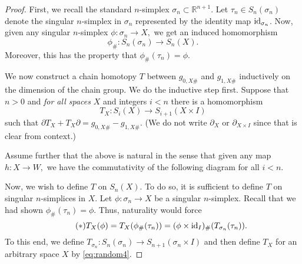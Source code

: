 \documentclass[12pt]{article}
\begin{document}
\begin{proof} 
	First, we recall the standard $n$-simplex $\sigma_n \subset \mathbb{R}^{n+1}.$ Let $\tau_n \in S_n(\sigma_n)$ denote the singular $n$-simplex in $\sigma_n$ represented by the identity map $\operatorname{id}_{\sigma_n}$. Now, given any singular $n$-simplex $\phi:\sigma_n \to X,$ we get an induced homomorphism
	\begin{equation*} 
		\phi_\# : S_n(\sigma_n) \to S_n(X).
	\end{equation*}
	Moreover, this has the property that $\phi_\#(\tau_n) = \phi.$

	We now construct a chain homotopy $T$ between $g_{0, X\#}$ and $g_{1, X\#}$ inductively on the dimension of the chain group. We do the inductive step first. Suppose that $n > 0$ and \emph{for all spaces} $X$ and integers $i < n$ there is a homomorphism
	\begin{equation*} 
		T_X:S_i(X) \to S_{i+1}(X\times I)
	\end{equation*}
	such that $\partial T_X + T_X\partial = g_{0, X\#} - g_{1, X\#}.$ (We do not write $\partial_X$ or $\partial_{X\times I}$ since that is clear from context.)

	Assume further that the above is natural in the sense that given any map $h:X \to W,$ we have the commutativity of the following diagram for all $i < n.$

	\begin{center}
	\end{center}

	Now, we wish to define $T$ on $S_n(X).$ To do so, it is sufficient to define $T$ on singular $n$-simplices in $X.$ Let $\phi:\sigma_n\to X$ be a singular $n$-simplex. Recall that we had shown $\phi_{\#}(\tau_n) = \phi.$ Thus, naturality would force
	\begin{equation} \tag{$*$} \label{eq:random4}
		T_X(\phi) = T_X(\phi_\#(\tau_n)) = (\phi\times\operatorname{id}_I)_\#(T_{\sigma_n}(\tau_n)). 
	\end{equation}
	To this end, we define $T_{\sigma_n}:S_n(\sigma_n)\to S_{n+1}(\sigma_n\times I)$ and then define $T_X$ for an arbitrary space $X$ by \cref{eq:random4}.


\end{proof}
\end{document}
